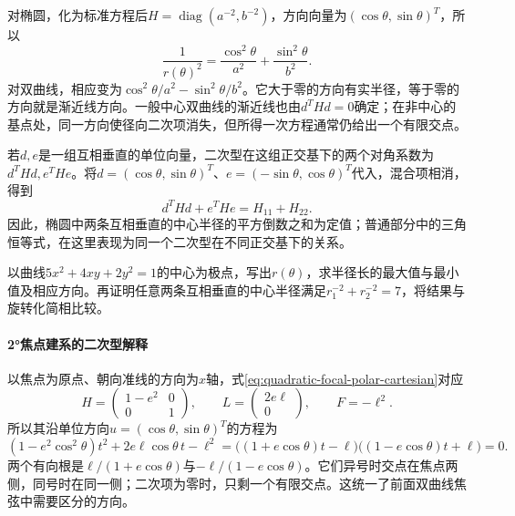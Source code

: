 对椭圆，化为标准方程后\(H=\operatorname{diag}(a^{-2},b^{-2})\)，方向向量为\((\cos\theta,\sin\theta)^T\)，所以
\begin{equation*}
 \frac1{r(\theta)^2}=\frac{\cos^2\theta}{a^2}+\frac{\sin^2\theta}{b^2}.
\end{equation*}
对双曲线，相应变为\(\cos^2\theta/a^2-\sin^2\theta/b^2\)。它大于零的方向有实半径，等于零的方向就是渐近线方向。一般中心双曲线的渐近线也由\(d^THd=0\)确定；在非中心的基点处，同一方向使径向二次项消失，但所得一次方程通常仍给出一个有限交点。

若\(d,e\)是一组互相垂直的单位向量，二次型在这组正交基下的两个对角系数为\(d^THd,e^THe\)。将\(d=(\cos\theta,\sin\theta)^T\)、\(e=(-\sin\theta,\cos\theta)^T\)代入，混合项相消，得到
\begin{equation}\label{eq:quadratic-orthogonal-radial-trace}
 d^THd+e^THe=H_{11}+H_{22}.
\end{equation}
因此，椭圆中两条互相垂直的中心半径的平方倒数之和为定值；普通部分中的三角恒等式，在这里表现为同一个二次型在不同正交基下的关系。

\par\addvspace{6pt}\noindent\begin{minipage}{\linewidth}
\begin{example}
以曲线\(5x^2+4xy+2y^2=1\)的中心为极点，写出\(r(\theta)\)，求半径长的最大值与最小值及相应方向。再证明任意两条互相垂直的中心半径满足\(r_1^{-2}+r_2^{-2}=7\)，将结果与旋转化简相比较。
\end{example}
\end{minipage}\par\addvspace{6pt}

\paragraph{2°焦点建系的二次型解释} \mbox{}

以焦点为原点、朝向准线的方向为\(x\)轴，式\eqref{eq:quadratic-focal-polar-cartesian}对应
\begin{equation*}
 H=\begin{pmatrix}1-e^2&0\\0&1\end{pmatrix},\qquad
 L=\begin{pmatrix}2e\ell\\0\end{pmatrix},\qquad
 F=-\ell^2.
\end{equation*}
所以其沿单位方向\(\widehat u=(\cos\theta,\sin\theta)^T\)的方程为
\begin{equation}\label{eq:quadratic-focal-radial-factorization}
 (1-e^2\cos^2\theta)t^2+2e\ell\cos\theta\,t-\ell^2
 =\bigl((1+e\cos\theta)t-\ell\bigr)
  \bigl((1-e\cos\theta)t+\ell\bigr)=0.
\end{equation}
两个有向根是\(\ell/(1+e\cos\theta)\)与\(-\ell/(1-e\cos\theta)\)。它们异号时交点在焦点两侧，同号时在同一侧；二次项为零时，只剩一个有限交点。这统一了前面双曲线焦弦中需要区分的方向。

